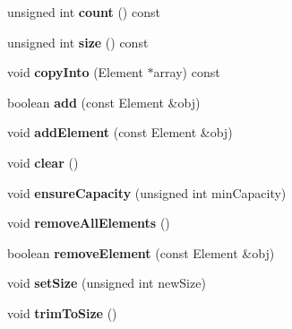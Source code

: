 \begin{DoxyCompactItemize}
\item 
\hypertarget{class_vector_a0fc67b265bbafc27e02db1885cb7e7b3}{}unsigned int {\bfseries count} () const \label{class_vector_a0fc67b265bbafc27e02db1885cb7e7b3}

\item 
\hypertarget{class_vector_a41afad4519922bf6ab7423af705e0d83}{}unsigned int {\bfseries size} () const \label{class_vector_a41afad4519922bf6ab7423af705e0d83}

\item 
\hypertarget{class_vector_acb8c95f2bc5ec3a3d7dc19ebcf4350f9}{}void {\bfseries copy\+Into} (Element $\ast$array) const \label{class_vector_acb8c95f2bc5ec3a3d7dc19ebcf4350f9}

\item 
\hypertarget{class_vector_ad22369e1452724ab5f11a1db39b2a3f7}{}boolean {\bfseries add} (const Element \&obj)\label{class_vector_ad22369e1452724ab5f11a1db39b2a3f7}

\item 
\hypertarget{class_vector_a50fcfbcb8e5ef8fcf2f31555d19fcdc8}{}void {\bfseries add\+Element} (const Element \&obj)\label{class_vector_a50fcfbcb8e5ef8fcf2f31555d19fcdc8}

\item 
\hypertarget{class_vector_a58943927e42eb108b6a71f9ddac2d71c}{}void {\bfseries clear} ()\label{class_vector_a58943927e42eb108b6a71f9ddac2d71c}

\item 
\hypertarget{class_vector_a4875dbea59d943f329e9484006920a2f}{}void {\bfseries ensure\+Capacity} (unsigned int min\+Capacity)\label{class_vector_a4875dbea59d943f329e9484006920a2f}

\item 
\hypertarget{class_vector_a7d2917e2feb707d087724e22a20565b2}{}void {\bfseries remove\+All\+Elements} ()\label{class_vector_a7d2917e2feb707d087724e22a20565b2}

\item 
\hypertarget{class_vector_a7a7db99cf205d29a607b4ab87946da19}{}boolean {\bfseries remove\+Element} (const Element \&obj)\label{class_vector_a7a7db99cf205d29a607b4ab87946da19}

\item 
\hypertarget{class_vector_a153d5127513af82bd8d99f204baea30a}{}void {\bfseries set\+Size} (unsigned int new\+Size)\label{class_vector_a153d5127513af82bd8d99f204baea30a}

\item 
\hypertarget{class_vector_a8dcaa572c7649e794b1fd14e61eea951}{}void {\bfseries trim\+To\+Size} ()\label{class_vector_a8dcaa572c7649e794b1fd14e61eea951}


\end{DoxyCompactItemize}
